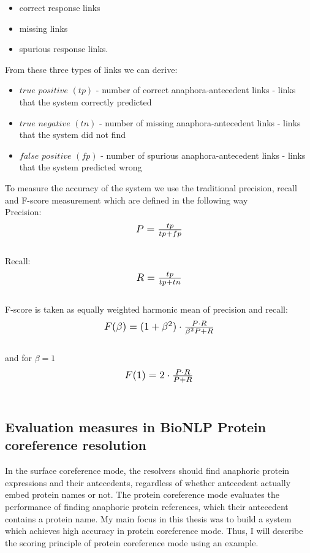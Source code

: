 \begin{itemize}
  \item correct response links
  \item missing links
  \item spurious response links.
\end{itemize}
From these three types of links we can derive:
\begin{itemize}	
 \item $true$ $positive$ $(tp)$ - number of  correct anaphora-antecedent links - links that the system correctly predicted\\
 \item $true$ $negative$ $(tn)$ - number of missing anaphora-antecedent links - links that the system did not find\\
 \item $false$ $positive$ $(fp)$ - number of spurious anaphora-antecedent links - links that the system predicted wrong \\
\end{itemize}
To measure the accuracy of the system we use the traditional  precision, recall and F-score  measurement which are defined in the following way\\
\hspace{2cm}  Precision: \hspace{1cm}\\
\hspace{4cm}\[ \scalebox{1.2} {$P =\frac{tp}{tp+fp}$}\] \\
\hspace{2cm} Recall: \\
\hspace{4cm} \[ \scalebox{1.2} {$R=\frac{tp}{tp+tn}$}\] \\
F-score is taken as equally weighted harmonic mean of precision and recall:\\
\[ \scalebox{1.2} {$F(\beta)=(1+\beta^2)\cdot \frac{P\cdot R}{\beta^2P+R}$}\] \\
 and for $\beta=1$ \\
\[ \scalebox{1.2} {$F(1)=2\cdot \frac{P \cdot R}{P+R}$}\]\\
\subsection{Evaluation measures in BioNLP Protein coreference resolution}

In the surface coreference mode, the resolvers should find anaphoric protein expressions and their antecedents, regardless of whether antecedent actually embed protein names or not. 
The protein coreference mode evaluates the performance of finding anaphoric protein references, which their antecedent contains a protein name. 
My main focus in this thesis was to build a system which achieves high accuracy in protein coreference mode. Thus, I will describe the scoring principle of protein coreference mode using an example.

